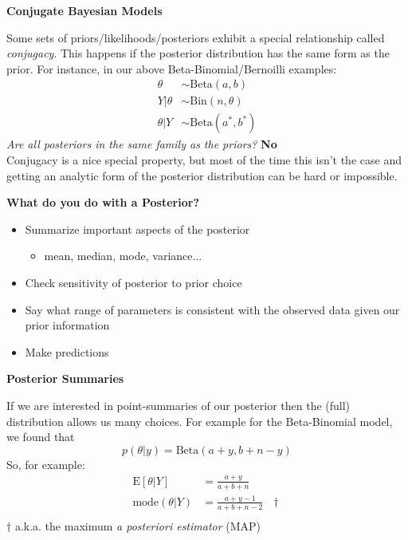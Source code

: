 \documentclass[12pt,xcolor=svgnames]{beamer}
\newcommand{\rd}{\color{red}}
\newcommand{\bl}{\color{blue}}
\newcommand{\theme}{\color{FireBrick}}
\newcommand{\mr}[1]{\mathrm{#1}}
\newcommand{\sk}{\vspace{.4cm}}
\newcommand{\chap}[1]{{\theme \Large \bf #1} \sk}
\begin{document}
\begin{frame}
\chap{Conjugate Bayesian Models}

Some sets of priors/likelihoods/posteriors exhibit a special relationship called {\em \bl conjugacy}. This happens if the posterior distribution has the same form as the prior. For instance, in our above Beta-Binomial/Bernoilli examples:
\begin{align*}
\theta & \sim \mr{Beta} (a,b)\\
Y|\theta &  \sim \mr{Bin} (n, \theta)\\
\theta | Y & \sim \mr{Beta}(a^*, b^*)
\end{align*}
{\em Are all posteriors in the same family as the priors?} {\rd \bf No}\\

Conjugacy is a nice special property, but most of the time this isn't the case and getting an analytic form of the posterior distribution can be hard or impossible.  

\end{frame}

\begin{frame}
\chap{What do you do with a Posterior?}

\begin{itemize}
\item Summarize important aspects of the posterior
	\begin{itemize}
	\item mean, median, mode, variance...
	\end{itemize}
\item Check sensitivity of posterior to prior choice
\item Say what range of parameters is consistent with the observed data given our prior information
\item Make predictions
\end{itemize}

\end{frame}

\begin{frame}
\chap{Posterior Summaries}

If we are interested in point-summaries of our posterior then the (full) distribution allows us many choices. For example for the Beta-Binomial model, we found that
\begin{equation*}
p(\theta | y)=\mr{Beta}(a+y, b+n-y)
\end{equation*}
So, for example:
\begin{align*}
\mr{E}[\theta|Y] & = \frac{a+y}{a+b+n} \\
\mr{mode}(\theta|Y) & = \frac{a+y-1}{a+b+n-2} ~~~ \dagger \\
\end{align*}
\vspace{0.25cm}
\hfill {\bl \footnotesize $\dagger$ a.k.a. the maximum {\em a posteriori estimator} (MAP)}
\end{frame}
\end{document}

